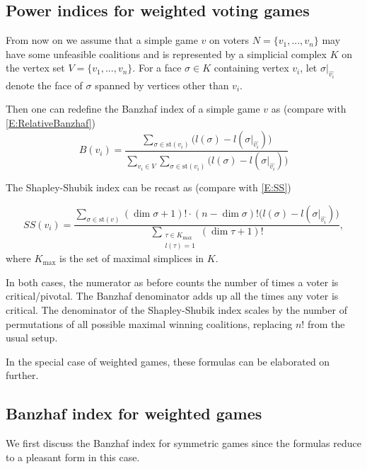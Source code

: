 \documentclass[11pt]{amsart}
\theoremstyle{plain}
\theoremstyle{definition}
\theoremstyle{remark}
\begin{document}


\subsection{Power indices for weighted voting games}\label{SS:IndicesSimple}

From now on we assume that a simple game $v$ on voters $N=\{v_1, ..., v_n\}$ may have some unfeasible coalitions and is represented by a simplicial complex $K$ on the vertex set $V=\{v_1, ..., v_n\}$. For a face $\sigma\in K$ containing vertex $v_i$, let $\sigma\vert_{\widehat{v_i}}$ denote the face of $\sigma$ spanned by vertices other than $v_i$.

Then one can redefine the Banzhaf index of a simple game $v$ as (compare with \eqref{E:RelativeBanzhaf})
\begin{equation}\label{E:SimplicialRelativeBanzhaf}
B(v_i)=\frac{\sum_{\sigma\in \text{st}(v_i)} \big(l(\sigma) - l(\sigma\vert_{\widehat{v_i}})  \big)}
{\sum_{v_i\in V}\sum_{\sigma\in \text{st}(v_i)} \big(l(\sigma) - l(\sigma\vert_{\widehat{v_i}})  \big)}
\end{equation}

The Shapley-Shubik index can be recast as (compare with \eqref{E:SS})

\begin{equation}\label{E:SimplicialSS}
SS(v_i)=\frac{\sum_{\sigma\in \text{st}(v)} (\dim \sigma+1)!\cdot(n-\dim \sigma)!\big(l(\sigma) - l(\sigma\vert_{\widehat{v_i}})  \big)}
{\sum_{\substack{\tau \in K_{\max} \\ l(\tau)=1}} (\dim\tau+1)!},
\end{equation}
where $K_{\max}$ is the set of maximal simplices in $K$.

In both cases, the numerator as before counts the number of times a voter is critical/pivotal. The Banzhaf denominator adds up all the times any voter is critical. The denominator of the Shapley-Shubik index scales by the number of permutations of all possible maximal winning coalitions, replacing $n!$ from the usual setup.

In the special case of weighted games, these formulas can be elaborated on further.

\subsection{Banzhaf index for weighted games}\label{SS:Banzhaf}
We first discuss the Banzhaf index for symmetric games since the formulas reduce to a pleasant form in this case.
\end{document}
